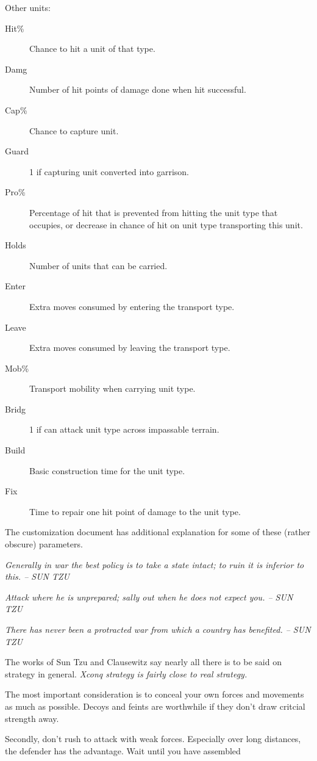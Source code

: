Other units:
\begin{description}
\item[{Hit\%}]
Chance to hit a unit of that type.
\item[{Damg}]
Number of hit points of damage done when hit successful.
\item[{Cap\%}]
Chance to capture unit.
\item[{Guard}]
1 if capturing unit converted into garrison.
\item[{Pro\%}]
Percentage of hit that is prevented from hitting the
unit type that occupies, or decrease in chance of hit
on unit type transporting this unit.
\item[{Holds}]
Number of units that can be carried.
\item[{Enter}]
Extra moves consumed by entering the transport type.
\item[{Leave}]
Extra moves consumed by leaving the transport type.
\item[{Mob\%}]
Transport mobility when carrying unit type.
\item[{Bridg}]
1 if can attack unit type across impassable terrain.
\item[{Build}]
Basic construction time for the unit type.
\item[{Fix}]
Time to repair one hit point of damage to the unit type.
\end{description}\par\noindent
The customization document has additional explanation for
some of these (rather obscure) parameters.
\par
\it
Generally in war the best policy is to take a state intact; to ruin it
is inferior to this.  -- SUN TZU
\rm
\par
\it
Attack where he is unprepared;
sally out when he does not expect you.  -- SUN TZU
\rm
\par
\it
There has never been a protracted war from which a country has
benefited. -- SUN TZU
\rm
\par\noindent
The works of Sun Tzu and Clausewitz say nearly all there is to
be said on strategy in general.
%
\it Xconq \rm%
strategy is fairly close to real strategy.
\par\noindent
The most important consideration is to conceal your own
forces and movements as much as possible.  Decoys and feints are worthwhile
if they don't draw critcial strength away.
\par\noindent
Secondly, don't rush to attack with weak forces.  Especially over long
distances, the defender has the advantage.  Wait until you have assembled
